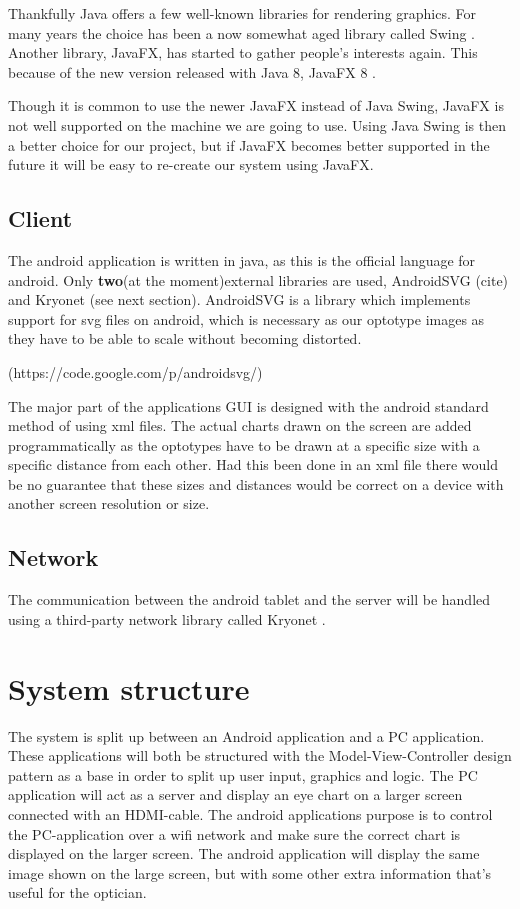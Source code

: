 \documentclass[12pt,a4paper,notitlepage]{report}
\begin{document}
Thankfully Java offers a few well-known libraries for rendering graphics. For many years the choice has been a now somewhat aged library called Swing \cite{Java_Swing}. Another library, JavaFX, has started to gather people's interests again. This because of the new version released with Java 8, JavaFX 8 \cite{JavaFX_8}. 

Though it is common to use the newer JavaFX instead of Java Swing, JavaFX is not well supported on the machine we are going to use. Using Java Swing is then a better choice for our project, but if JavaFX becomes better supported in the future it will be easy to re-create our system using JavaFX.

\subsection{Client}
The android application is written in java, as this is the official language for android. Only \textbf{two}(at the moment)external libraries are used, AndroidSVG (cite) and Kryonet (see next section). AndroidSVG is a library which implements support for svg files on android, which is necessary as our optotype images as they have to be able to scale without becoming distorted. 

(https://code.google.com/p/androidsvg/)

The major part of the applications GUI is designed with the android standard method of using xml files. The actual charts drawn on the screen are added programmatically as the optotypes have to be drawn at a specific size with a specific distance from each other. Had this been done in an xml file there would be no guarantee that these sizes and distances would be correct on a device with another screen resolution or size.

\subsection{Network}
The communication between the android tablet and the server will be handled using a third-party network library called Kryonet \cite{Kryonet}. 

\section{System structure} %
The system is split up between an Android application and a PC application. These applications will both be structured with the Model-View-Controller design pattern as a base in order to split up user input, graphics and logic. The PC application will act as a server and display an eye chart on a larger screen connected with an HDMI-cable. The android applications purpose is to control the PC-application over a wifi network and make sure the correct chart is displayed on the larger screen. The android application will display the same image shown on the large screen, but with some other extra information that's useful for the optician.
\end{document}
